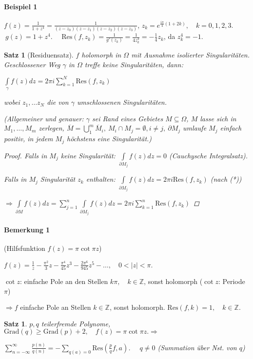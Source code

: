 \documentclass[ngerman,halfparskip]{scrartcl}
\newtheorem{satz}{Satz}[section]
\newtheorem*{satz*}{Satz}
\theoremstyle{definition}
\def\Z{\mathbb Z}
\def\Res{\text{Res}}
\begin{document}
\paragraph{Beispiel 1} $f(z)=\frac 1 {1+z^4}=\frac 1 {(z-z_0)(z-z_1)(z-z_2)(z-z_3)}$, $z_k=e^{\frac {i \pi}{4}(1+2k)}, \quad k=0,1,2,3$. $~g(z)=1+z^4$. $\quad\Res(f,z_k)=\frac 1{g'(z_k)}=\frac 1 {4z_k^3}=-\frac 14 z_k$, da $z_k^4=-1$.

\begin{satz*}[Residuensatz]
$f$ holomorph in $\Omega$ mit Ausnahme isolierter Singularitäten. Geschlossener Weg $\gamma$ in $\Omega$ treffe keine Singularitäten, dann:

$\int\limits_\gamma f(z) dz=2\pi i \sum\limits_{k=1}^N \Res (f,z_k)$

wobei $z_1,\ldots z_N$ die von $\gamma$ umschlossenen Singularitäten. 

(Allgemeiner und genauer: $\gamma$ sei Rand eines Gebietes $M\subseteq \Omega$, $M$ lasse sich in $M_1,\ldots,M_m$ zerlegen, $\overline M=\bigcup\limits _1^m\overline M_i,~M_i\cap M_j=\emptyset, i\neq j, ~\partial M_j$ umlaufe $M_j$ einfach positiv, in jedem $M_j$ höchstens eine Singularität.)
\begin{proof}
Falls in $M_j$ keine Singularität: $\int\limits_{\partial M_j}f(z)dz=0$ (Cauchysche Integralsatz).

Falls in $M_j$ Singularität $z_k$ enthalten: $\int\limits_{\partial M_j} f(z)dz=2\pi i \Res (f,z_k)$ (nach (*))

$\Rightarrow \int\limits_{\partial M} f(z)dz=\sum\limits_{j=1}^n \int\limits_{\partial M_j} f(z)dz=2\pi i \sum\limits_{k=1}^n \Res (f,z_k)$
\end{proof}
\end{satz*}

\paragraph{Bemerkung 1} (Hilfsfunktion $f(z)=\pi \cot \pi z$)

$f(z)=\frac 1z- \frac{\pi^2}3z-\frac{\pi^4}{45} z^3-\frac{2\pi^6}{945}z^5-\ldots,\quad 0<|z|<\pi $. 

$\cot z$: einfache Pole an den Stellen $k\pi, \quad k\in\Z$, sonst holomorph ($\cot z$: Periode $\pi$)

$\Rightarrow f$ einfache Pole an Stellen $k\in\Z$, sonst holomorph. $\Res (f,k) =1, \quad k\in\Z$.

\begin{satz}
$p,q$ teilerfremde Polynome, $\text{Grad}(q)\geq \text{Grad}(p)+2,\quad f(z)=\pi\cot\pi z. \Rightarrow$

$\sum\limits_{n=-\infty}^\infty \frac{p(n)}{q(n)}=-\sum_{q(a)=0}\Res(\frac pq f,a)$. $\quad q\neq 0$ (Summation über Nst. von $q$)
\end{satz}
\end{document}
